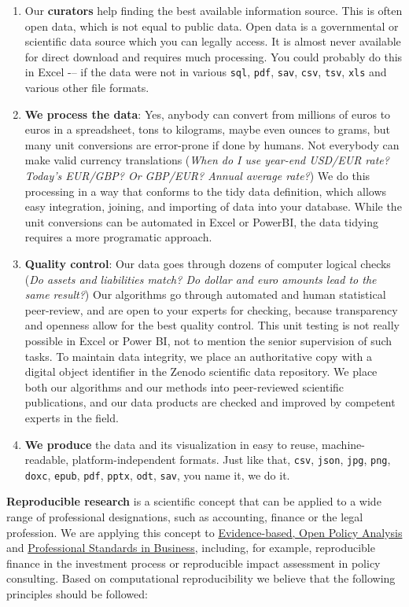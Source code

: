 \documentclass[
  a4paper,
  openany, a4paper, oneside]{book}
\begin{document}
\begin{enumerate}
\def\labelenumi{\arabic{enumi}.}
\item
  Our \textbf{curators} help finding the best available information source. This is often open data, which is not equal to public data. Open data is a governmental or scientific data source which you can legally access. It is almost never available for direct download and requires much processing. You could probably do this in Excel -\/-- if the data were not in various \texttt{sql}, \texttt{pdf}, \texttt{sav}, \texttt{csv}, \texttt{tsv}, \texttt{xls} and various other file formats.
\item
  \textbf{We process the data}: Yes, anybody can convert from millions of euros to euros in a spreadsheet, tons to kilograms, maybe even ounces to grams, but many unit conversions are error-prone if done by humans. Not everybody can make valid currency translations (\emph{When do I use year-end USD/EUR rate? Today's EUR/GBP? Or GBP/EUR? Annual average rate?}) We do this processing in a way that conforms to the tidy data definition, which allows easy integration, joining, and importing of data into your database. While the unit conversions can be automated in Excel or PowerBI, the data tidying requires a more programatic approach.
\item
  \textbf{Quality control}: Our data goes through dozens of computer logical checks (\emph{Do assets and liabilities match? Do dollar and euro amounts lead to the same result?}) Our algorithms go through automated and human statistical peer-review, and are open to your experts for checking, because transparency and openness allow for the best quality control. This unit testing is not really possible in Excel or Power BI, not to mention the senior supervision of such tasks. To maintain data integrity, we place an authoritative copy with a digital object identifier in the Zenodo scientific data repository. We place both our algorithms and our methods into peer-reviewed scientific publications, and our data products are checked and improved by competent experts in the field.
\item
  \textbf{We produce} the data and its visualization in easy to reuse, machine-readable, platform-independent formats. Just like that, \texttt{csv}, \texttt{json}, \texttt{jpg}, \texttt{png}, \texttt{doxc}, \texttt{epub}, \texttt{pdf}, \texttt{pptx}, \texttt{odt}, \texttt{sav}, you name it, we do it.
\end{enumerate}

\textbf{Reproducible research} is a scientific concept that can be applied to a wide range of professional designations, such as accounting, finance or the legal profession. We are applying this concept to \protect\hyperlink{opa}{Evidence-based, Open Policy Analysis} and \protect\hyperlink{business-professional-standards}{Professional Standards in Business}, including, for example, reproducible finance in the investment process or reproducible impact assessment in policy consulting. Based on computational reproducibility we believe that the following principles should be followed:
\end{document}
